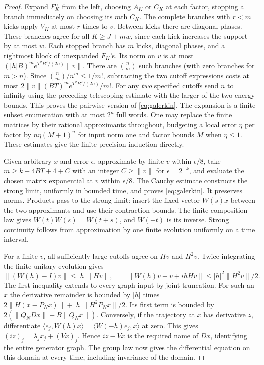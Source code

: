 \begin{proof}
Expand $F_K^n$ from the left, choosing $A_K$ or $C_K$ at each
factor, stopping a branch immediately on choosing its $m$th $C_K$.
The complete branches with $r<m$ kicks apply $V_K$ at most $r$ times
to $v$. Between kicks there are diagonal phases. These branches agree
for all $K\ge J+mw$, since each kick increases the support by at
most $w$. Each stopped branch has $m$ kicks, diagonal phases, and a
rightmost block of unexpanded $F_K$'s. Its norm on $v$ is at most
$(|h|B)^m e^{T^2B^2/(2n)}\|v\|$. There are $\binom nm$ such branches
(with zero branches for $m>n$). Since
$\binom nm/n^m\le1/m!$, subtracting the two cutoff expressions
costs at most $2\|v\|(BT)^m e^{T^2B^2/(2n)}/m!$.
For any \emph{two} specified cutoffs send $n$ to infinity using the preceding
telescoping estimate with the larger of the two energy bounds. This proves the
pairwise version of \eqref{eq:galerkin}. The expansion is a finite
subset enumeration with at most $2^n$ full words. One may replace
the finite matrices by their rational approximants throughout, budgeting
a local error $\eta$ per factor by $n\eta(M+1)^n$ for input norm one
and factor bounds $M$ when $\eta\le1$. These estimates give the
finite-precision induction directly.

Given arbitrary $x$ and error $\epsilon$, approximate by finite $v$
within $\epsilon/8$, take
$m\ge k+4BT+4+C$ with an integer $C\ge\|v\|$ for $\epsilon=2^{-k}$, and evaluate
the chosen matrix exponential at $v$ within $\epsilon/8$.
The Cauchy estimate constructs the strong limit, uniformly in bounded
time, and proves \eqref{eq:galerkin}. It preserves norms. Products pass
to the strong limit: insert the fixed vector $W(s)x$ between the
two approximants and use their contraction bounds. The finite
composition law gives $W(t)W(s)=W(t+s)$, and $W(-t)$ is its inverse.
Strong continuity follows from approximation by one finite evolution
uniformly on a time interval.

For a finite $v$, all sufficiently large cutoffs agree on $H v$ and
$H^2v$. Twice integrating the finite unitary evolution gives
\[
 \|(W(h)-I)v\|\le |h|\|Hv\|,\qquad
 \|W(h)v-v+ihHv\|\le |h|^2\|H^2v\|/2.
\]
The first inequality extends to every graph input by joint truncation.
For such an $x$ the derivative remainder is bounded by $|h|$ times $2\|H(x-P_Nx)\|+|h|\|H^2P_Nx\|/2$. Its first term is
bounded by $2(\|Q_NDx\|+B\|Q_Nx\|)$.
Conversely, if the trajectory at $x$ has derivative $z$, differentiate
$\langle e_j,W(h)x\rangle=\langle W(-h)e_j,x\rangle$ at zero.
This gives $(iz)_j=\lambda_j x_j+(Vx)_j$. Hence $iz-Vx$ is the
required name of $Dx$, identifying the entire generator graph.
The group law now gives the differential equation on this domain
at every time, including invariance of the domain.
\end{proof}

